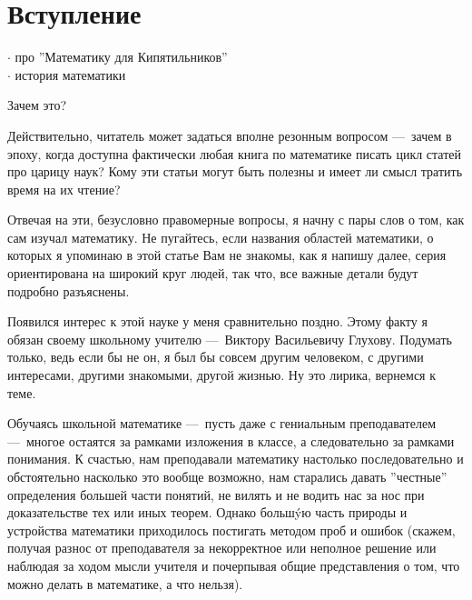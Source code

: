 \documentclass[math.tex]{subfiles}
\begin{document}
\chapter{Вступление}

	\LARGE{
		$\cdot$ про ''Математику для Кипятильников''\\
		$\cdot$ история математики
	}\\

\pagebreak


	\LARGE{Зачем это?}\\
	\normalsize
	
	Действительно, читатель может задаться вполне резонным вопросом —\ зачем в эпоху, когда доступна фактически любая книга по математике писать цикл статей про царицу наук? 
Кому эти статьи могут быть полезны и имеет ли смысл тратить время на их чтение?

	Отвечая на эти, безусловно правомерные вопросы, я начну с пары слов о том, как сам изучал математику.
Не пугайтесь, если названия областей математики, о которых я упоминаю в этой статье Вам не знакомы, как я напишу далее, серия ориентирована на широкий круг людей, так что, все важные детали будут подробно разъяснены.
	
	Появился интерес к этой науке у меня сравнительно поздно. Этому факту я обязан своему школьному учителю —\ Виктору Васильевичу Глухову. 
Подумать только, ведь если бы не он, я был бы совсем другим человеком, с другими интересами, другими знакомыми, другой жизнью. 
Ну это лирика, вернемся к теме. 
	
	Обучаясь школьной математике —\ пусть даже с гениальным преподавателем —\ многое остаятся за рамками изложения в классе, а следовательно за рамками понимания. 
К счастью, нам преподавали матем\-атику настолько последовательно и обстоятельно насколько это вообще возможно, нам старались давать ''честные'' определения большей части понятий, не вилять и не водить нас за нос при до\-ка\-за\-тельстве тех или иных теорем. 
Однако большýю часть природы и устройства математики приходилось постигать методом проб и ошибок (скажем, получая раз\-нос от пре\-под\-авателя за некорректное или неполное решение или наблюдая за ходом мысли учителя и почерпывая общие пред\-ставления о том, что можно делать в математике, а что нельзя).
	
\end{document}
